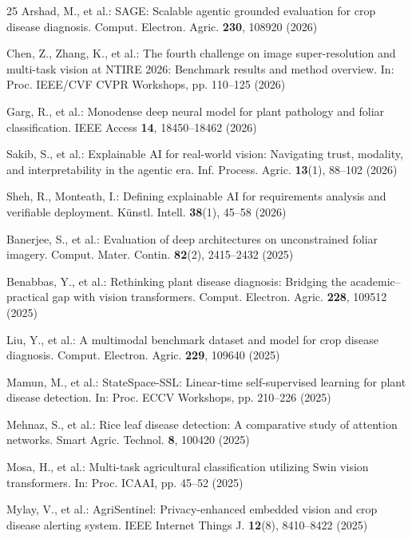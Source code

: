 \documentclass[runningheads]{llncs}
\begin{document}
\begin{thebibliography}{25}
Arshad, M., et al.: SAGE: Scalable agentic grounded evaluation for crop disease diagnosis. Comput. Electron. Agric. \textbf{230}, 108920 (2026)

Chen, Z., Zhang, K., et al.: The fourth challenge on image super-resolution and multi-task vision at NTIRE 2026: Benchmark results and method overview. In: Proc. IEEE/CVF CVPR Workshops, pp. 110--125 (2026)

Garg, R., et al.: Monodense deep neural model for plant pathology and foliar classification. IEEE Access \textbf{14}, 18450--18462 (2026)

Sakib, S., et al.: Explainable AI for real-world vision: Navigating trust, modality, and interpretability in the agentic era. Inf. Process. Agric. \textbf{13}(1), 88--102 (2026)

Sheh, R., Monteath, I.: Defining explainable AI for requirements analysis and verifiable deployment. K{\"u}nstl. Intell. \textbf{38}(1), 45--58 (2026)

Banerjee, S., et al.: Evaluation of deep architectures on unconstrained foliar imagery. Comput. Mater. Contin. \textbf{82}(2), 2415--2432 (2025)

Benabbas, Y., et al.: Rethinking plant disease diagnosis: Bridging the academic--practical gap with vision transformers. Comput. Electron. Agric. \textbf{228}, 109512 (2025)

Liu, Y., et al.: A multimodal benchmark dataset and model for crop disease diagnosis. Comput. Electron. Agric. \textbf{229}, 109640 (2025)

Mamun, M., et al.: StateSpace-SSL: Linear-time self-supervised learning for plant disease detection. In: Proc. ECCV Workshops, pp. 210--226 (2025)

Mehnaz, S., et al.: Rice leaf disease detection: A comparative study of attention networks. Smart Agric. Technol. \textbf{8}, 100420 (2025)

Mosa, H., et al.: Multi-task agricultural classification utilizing Swin vision transformers. In: Proc. ICAAI, pp. 45--52 (2025)

Mylay, V., et al.: AgriSentinel: Privacy-enhanced embedded vision and crop disease alerting system. IEEE Internet Things J. \textbf{12}(8), 8410--8422 (2025)


\end{thebibliography}
\end{document}
